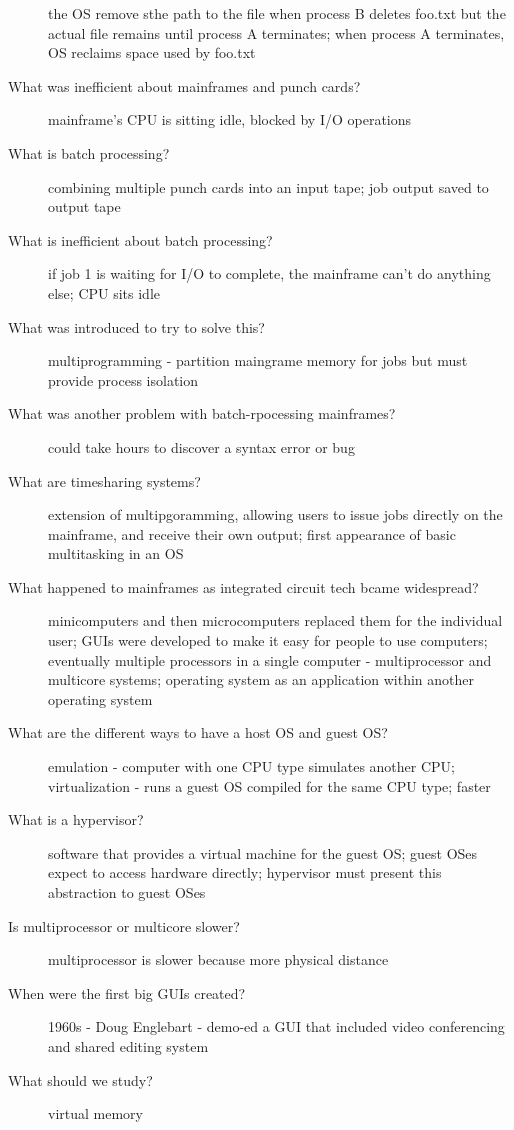 \documentclass[10pt]{article}
\begin{document}
\begin{description}
  the OS remove sthe path to the file when process B deletes foo.txt but the actual file remains until process A terminates;
  when process A terminates, OS reclaims space used by foo.txt
\item[What was inefficient about mainframes and punch cards?]
  mainframe's CPU is sitting idle, blocked by I/O operations
\item[What is batch processing?]
  combining multiple punch cards into an input tape; job output saved to output tape
\item[What is inefficient about batch processing?]
  if job 1 is waiting for I/O to complete, the mainframe can't do anything else; CPU sits idle
\item[What was introduced to try to solve this?]
  multiprogramming - partition maingrame memory for jobs but must provide process isolation
\item[What was another problem with batch-rpocessing mainframes?]
  could take hours to discover a syntax error or bug
\item[What are timesharing systems?]
  extension of multipgoramming, allowing users to issue jobs directly on the mainframe, and receive their own output;
  first appearance of basic multitasking in an OS
\item[What happened to mainframes as integrated circuit tech bcame widespread?]
  minicomputers and then microcomputers replaced them for the individual user; GUIs were developed to make it easy for people to use computers;
  eventually multiple processors in a single computer - multiprocessor and multicore systems;
  operating system as an application within another operating system
\item[What are the different ways to have a host OS and guest OS?]
  emulation - computer with one CPU type simulates another CPU;
  virtualization - runs a guest OS compiled for the same CPU type; faster
\item[What is a hypervisor?]
  software that provides a virtual machine for the guest OS;
  guest OSes expect to access hardware directly; hypervisor must present this abstraction to guest OSes
\item[Is multiprocessor or multicore slower?]
  multiprocessor is slower because more physical distance
\item[When were the first big GUIs created?]
  1960s - Doug Englebart - demo-ed a GUI that included video conferencing and shared editing system
\item[What should we study?]
  virtual memory

\end{description}
\end{document}
